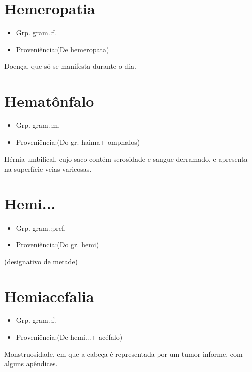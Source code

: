 \documentclass{article}
\begin{document}
\section{Hemeropatia}
\begin{itemize}
\item {Grp. gram.:f.}
\end{itemize}
\begin{itemize}
\item {Proveniência:(De \textunderscore hemeropata\textunderscore )}
\end{itemize}
Doença, que só se manifesta durante o dia.
\section{Hematônfalo}
\begin{itemize}
\item {Grp. gram.:m.}
\end{itemize}
\begin{itemize}
\item {Proveniência:(Do gr. \textunderscore haima\textunderscore  + \textunderscore omphalos\textunderscore )}
\end{itemize}
Hérnia umbilical, cujo saco contém serosidade e sangue derramado, e apresenta na superfície veias varicosas.
\section{Hemi...}
\begin{itemize}
\item {Grp. gram.:pref.}
\end{itemize}
\begin{itemize}
\item {Proveniência:(Do gr. \textunderscore hemi\textunderscore )}
\end{itemize}
(designativo de \textunderscore metade\textunderscore )
\section{Hemiacefalia}
\begin{itemize}
\item {Grp. gram.:f.}
\end{itemize}
\begin{itemize}
\item {Proveniência:(De \textunderscore hemi...\textunderscore  + \textunderscore acéfalo\textunderscore )}
\end{itemize}
Monstruosidade, em que a cabeça é representada por um tumor informe, com alguns apêndices.
\end{document}
